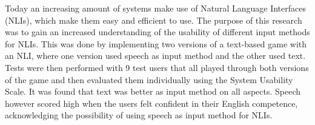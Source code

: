 Today an increasing amount of systems make use of Natural Language Interfaces (NLIs), which make them easy and efficient to use. The purpose of this research was to gain an increased understanding of the usability of different input methods for NLIs. This was done by implementing two versions of a text-based game with an NLI, where one version used speech as input method and the other used text. Tests were then performed with 9 test users that all played through both versions of the game and then evaluated them individually using the System Usability Scale. It was found that text was better as input method on all aspects. Speech however scored high when the users felt confident in their English competence, acknowledging the possibility of using speech as input method for NLIs.
